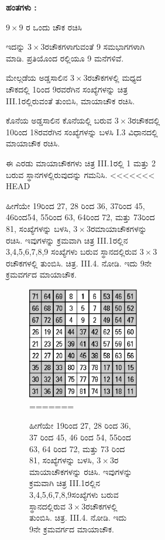 \begin{figure}[H]
\begin{figure}[H]
\begin{figure}[h]
\smallskip
\textbf{ಹಂತಗಳು :}
\begin{itemize}
	\item $9 \times 9$ ರ ಒಂದು ಚೌಕ ರಚಿಸಿ
	\item ಇದನ್ನು $3 \times 3$ರಚೌಕಗಳಾಗುವಂತೆ 9 ಸಮಭಾಗಗಳಾಗಿ ಮಾಡಿ. ಪ್ರತಿಯೊಂದ ರಲ್ಲಿಯೂ 9 ಮನೆಗಳಿವೆ.
	\item ಮೇಲ್ಗಡೆಯ ಅಡ್ಡಸಾಲಿನ $3 \times 3$ರಚೌಕಗಳಲ್ಲಿ ಮಧ್ಯದ ಚೌಕದಲ್ಲಿ 1ರಿಂದ 9ರ\break ವರೆಗಿನ ಸಂಖ್ಯೆಗಳನ್ನು ಚಿತ್ರ III.1ರಲ್ಲಿರುವಂತೆ ತುಂಬಿಸಿ, ಮಾಯಾಚೌಕ ರಚಿಸಿ.
	\item ಕೊನೆಯ ಅಡ್ಡಸಾಲಿನ ಕೊನೆಯಲ್ಲಿ ಬರುವ $3 \times 3$ರಚೌಕದಲ್ಲಿ 10ರಿಂದ 18ರವರೆಗಿನ ಸಂಖ್ಯೆಗಳನ್ನು ಬಳಸಿ I.3 ವಿಧಾನದಲ್ಲಿ ಮಾಯಾಚೌಕ ರಚಿಸಿ.
	\item ಈ ಎರಡು ಮಾಯಾಚೌಕಗಳು ಚಿತ್ರ III.1ರಲ್ಲಿ 1 ಮತ್ತು 2 ಬರುವ ಸ್ಥಾನಗಳಲ್ಲಿರುವುದನ್ನು ಗಮನಿಸಿ.
<<<<<<< HEAD
	\item ಹೀಗೆಯೇ 19ರಿಂದ 27, 28 ರಿಂದ 36, 37ರಿಂದ 45, 46ರಿಂದ54, 55ರಿಂದ 63, 64ರಿಂದ 72, ಮತ್ತು 73ರಿಂದ 81, ಸಂಖ್ಯೆಗಳನ್ನು ಬಳಸಿ, $3 \times 3$ರಮಾಯಾಚೌಕಗಳನ್ನು 
	ರಚಿಸಿ. ಇವುಗಳನ್ನು ಕ್ರಮವಾಗಿ ಚಿತ್ರ III.1ರಲ್ಲಿನ 3,4,5,6,7,8,9 ಸಂಖ್ಯೆಗಳು ಬರುವ ಸ್ಥಾನದಲ್ಲಿರುವ $3 \times 3$ರಚೌಕಗಳಲ್ಲಿ ತುಂಬಿಸಿ. ಚಿತ್ರ. III.4. ನೋಡಿ. ಇದು 9ನೇ ಕ್ರಮವರ್ಗದ ಮಾಯಾಚೌಕ.
	\begin{figure}[H]
	\includegraphics{src/figures/chap3/fig3-31.eps}
=======
	\item ಹೀಗೆಯೇ 19ರಿಂದ 27, 28 ರಿಂದ 36, 37 ರಿಂದ 45, 46 ರಿಂದ 54, 55ರಿಂದ 63, 64 ರಿಂದ 72, ಮತ್ತು 73 ರಿಂದ 81, ಸಂಖ್ಯೆಗಳನ್ನು ಬಳಸಿ, $3 \times 3$ರ ಮಾಯಾ\-ಚೌಕಗಳನ್ನು  ರಚಿಸಿ. ಇವುಗಳನ್ನು ಕ್ರಮವಾಗಿ ಚಿತ್ರ III.1ರಲ್ಲಿನ 3,4,5,6,7,8,9\break ಸಂಖ್ಯೆಗಳು ಬರುವ ಸ್ಥಾನದಲ್ಲಿರುವ $3 \times 3$ರಚೌಕಗಳಲ್ಲಿ ತುಂಬಿಸಿ. ಚಿತ್ರ. III.4. ನೋಡಿ. ಇದು 9ನೇ ಕ್ರಮವರ್ಗದ ಮಾಯಾಚೌಕ.

\end{figure}
\end{itemize}
\end{figure}
\end{figure}
\end{figure}
